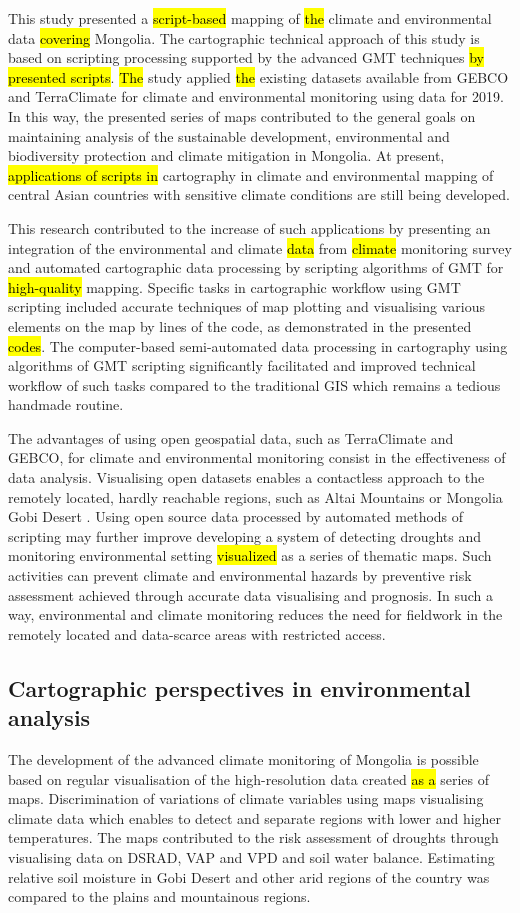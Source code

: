 \documentclass[geosciences,article,submit,pdftex,moreauthors]{Definitions/mdpi}
\begin{document}
This study presented a \hl{script-based} mapping of \hl{the} climate and environmental data \hl{covering} Mongolia. The cartographic technical approach of this study is based on scripting processing supported by the advanced GMT techniques \hl{by presented scripts}. \hl{The} study applied \hl{the} existing datasets available from GEBCO and TerraClimate for climate and environmental monitoring using data for 2019. In this way, the presented series of maps contributed to the general goals on maintaining analysis of the sustainable development, environmental and biodiversity protection and climate mitigation in Mongolia. At present, \hl{applications of scripts in} cartography in climate and environmental mapping of central Asian countries with sensitive climate conditions are still being developed. 

This research contributed to the increase of such applications by presenting an integration of the environmental and climate \hl{data} from \hl{climate} monitoring survey and automated cartographic data processing by scripting algorithms of GMT for \hl{high-quality} mapping. Specific tasks in cartographic workflow using GMT scripting included accurate techniques of map plotting and visualising various elements on the map by lines of the code, as demonstrated in the presented \hl{codes}. The computer-based semi-automated data processing in cartography using algorithms of GMT scripting significantly facilitated and improved technical workflow of such tasks compared to the traditional GIS which remains a tedious handmade routine. 

The advantages of using open geospatial data, such as TerraClimate and GEBCO, for climate and environmental monitoring consist in the effectiveness of data analysis. Visualising open datasets enables a contactless approach to the remotely located, hardly reachable regions, such as Altai Mountains or Mongolia Gobi Desert \cite{HEINER202078}. Using open source data processed by automated methods of scripting may further improve developing a system of detecting droughts and monitoring environmental setting \hl{visualized} as a series of thematic maps. Such activities can prevent climate and environmental hazards by preventive risk assessment achieved through accurate data visualising and prognosis. In such a way, environmental and climate monitoring reduces the need for fieldwork in the remotely located and data-scarce areas with restricted access.

\subsection{Cartographic perspectives in environmental analysis}
The development of the advanced climate monitoring of Mongolia is possible based on regular visualisation of the high-resolution data created \hl{as a} series of maps. Discrimination of variations of climate variables using maps visualising climate data which enables to detect and separate regions with lower and higher temperatures. The maps contributed to the risk assessment of droughts through visualising data on DSRAD, VAP and VPD and soil water balance. Estimating relative soil moisture in Gobi Desert and other arid regions of the country was compared to the plains and mountainous regions. 
\end{document}
